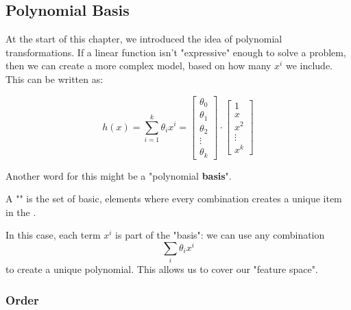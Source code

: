         \subsection{Polynomial Basis}

            At the start of this chapter, we introduced the idea of polynomial transformations. If a linear function isn't "expressive" enough to solve a problem, then we can create a more complex model, based on how many $x^i$ we include. This can be written as:

            \begin{equation}
                h(x) =
                \sum_{i=1}^{k}
                \theta_i x^i
                =
                \begin{bmatrix}
                 \theta_0 \\ \theta_1 \\ \theta_2 \\ \vdots \\ \theta_k
                \end{bmatrix}
                \cdot 
                \begin{bmatrix}
                    1 \\ x \\ x^2 \\ \vdots \\ x^k
                \end{bmatrix}
            \end{equation}

            Another word for this might be a "polynomial \textbf{basis}".\\

            \begin{definition}
                A "" is the set of basic,  elements where every  combination creates a unique item in the .
            \end{definition}

            In this case, each term $x^i$ is part of the "basis": we can use any combination $$\sum_i \theta_i x^i$$ to create a unique polynomial. This allows us to cover our "feature space".



            \subsecdiv
            
            \subsubsection{Order}
            
